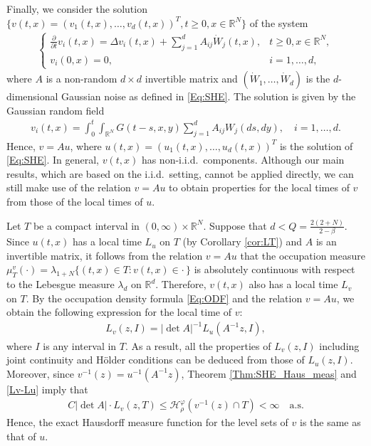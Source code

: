 \documentclass[11pt, reqno]{amsart}
\def\R{{\mathbb R}}
\numberwithin{equation}{section}
\begin{document}
Finally, we consider the solution $\{ v(t, x) = (v_1(t, x), \dots, v_d(t, x))^T, t \ge 0, x \in \R^N \}$ of the system
\begin{align}\label{Eq:CSHE}
\begin{cases}
\displaystyle\frac{\partial}{\partial t} v_i(t, x) = \Delta v_i(t, x) + \sum_{j=1}^d A_{ij} \dot{W}_j(t, x), & t \ge 0, x \in \R^N,\\
v_i(0, x) = 0, & i = 1, \dots, d,
\end{cases}
\end{align}
where $A$ is a non-random $d \times d$ invertible matrix and $(\dot{W}_1, \dots, \dot{W}_d)$ is the $d$-dimensional 
Gaussian noise as defined in \eqref{Eq:SHE}. 
The solution is given by the Gaussian random field
\begin{align*}
v_i(t, x) = \int_0^t \int_{\R^N} G(t-s, x, y) \sum_{j=1}^d A_{ij} W_j(ds, dy), \quad i = 1, \dots, d.
\end{align*}
Hence, $v = Au$, where $u(t, x) = (u_1(t, x), \dots, u_d(t, x))^T$ is the solution of \eqref{Eq:SHE}.
In general, $v(t, x)$ has non-i.i.d.~components. Although our main results, which are based on the i.i.d.~setting, 
cannot be applied directly, we can still make use of the relation $v = Au$ to obtain properties for the local times of 
$v$ from those of the local times of $u$.

Let $T$ be a compact interval in $(0, \infty) \times \R^N$. 
Suppose that $d < Q = \frac{2(2+N)}{2-\beta}$.
Since $u(t, x)$ has a local time $L_u$ on $T$ (by Corollary \ref{cor:LT}) and $A$ is an invertible matrix, it follows 
from the relation $v = Au$ that the occupation measure $\mu^v_T(\cdot) = \lambda_{1+N}\{(t, x) \in T : v(t, x) \in \cdot\, \}$ 
is absolutely continuous with respect to the Lebesgue measure $\lambda_d$ on $\R^d$. 
Therefore, $v(t, x)$ also has a local time $L_v$ on $T$.
By the occupation density formula \eqref{Eq:ODF} and the relation $v = Au$, we obtain the following expression 
for the local time of $v$:
\begin{align}\label{Lv-Lu}
L_v(z, I) = |\det A|^{-1} L_u(A^{-1}z, I),
\end{align}
where $I$ is any interval in $T$.
As a result, all the properties of $L_v(z, I)$ including joint continuity and H\"older conditions can be deduced 
from those of $L_u(z, I)$. Moreover, since $v^{-1}(z) = u^{-1}(A^{-1}z)$, Theorem \ref{Thm:SHE_Haus_meas} and 
\eqref{Lv-Lu} imply that
\begin{align*}
C |\det A| \cdot L_v(z, T) \le \mathcal{H}^\varphi_\rho(v^{-1}(z) \cap T) < \infty \quad \text{a.s.}
\end{align*}
Hence, the exact Hausdorff measure function for the level sets of $v$ is the same as that of $u$.
\end{document}
